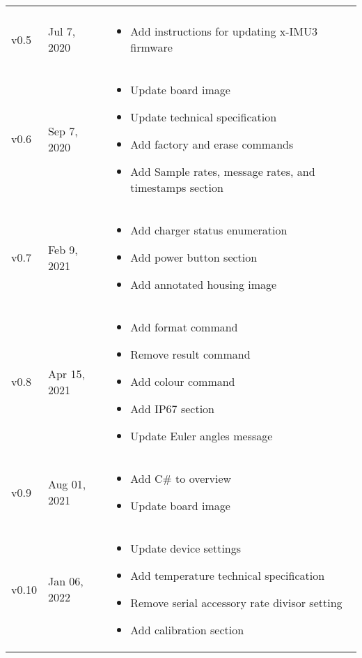 \begin{longtable}{| >{\centering}p{} | p{} | >{\raggedright\arraybackslash}p{} |}
\begin{itemize}
        \end{itemize}\\
        v0.5 & Jul 7, 2020 &
        \begin{itemize}
			\item Add instructions for updating x-IMU3 firmware
        \end{itemize}\\
        v0.6 & Sep 7, 2020 &
        \begin{itemize}
			\item Update board image
			\item Update technical specification
			\item Add factory and erase commands
			\item Add Sample rates, message rates, and timestamps section
        \end{itemize}\\
        v0.7 & Feb 9, 2021 &
        \begin{itemize}
			\item Add charger status enumeration
			\item Add power button section
			\item Add annotated housing image
        \end{itemize}\\
        v0.8 & Apr 15, 2021 &
        \begin{itemize}
			\item Add format command
			\item Remove result command
			\item Add colour command
			\item Add \ac{IP67} section
			\item Update Euler angles message
        \end{itemize}\\
        v0.9 & Aug 01, 2021 &
        \begin{itemize}
			\item Add C\# to overview
			\item Update board image
        \end{itemize}\\
        v0.10 & Jan 06, 2022 &
        \begin{itemize}
			\item Update device settings
			\item Add temperature technical specification
			\item Remove serial accessory rate divisor setting
			\item Add calibration section

\end{itemize}
\end{longtable}
